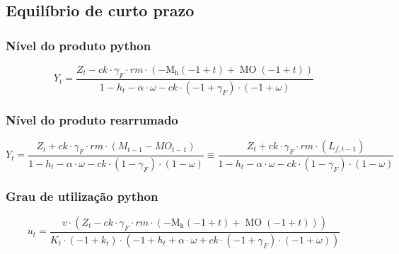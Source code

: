 \documentclass[11pt]{article}
\begin{document}
\subsection*{Equilíbrio de curto prazo}
\label{sec:orged3f1f8}

\subsubsection*{Nível do produto python}
\label{sec:org9433704}

\begin{latex}
\begin{equation}
Y_{t} = \frac{Z_t - ck \cdot \gamma_{F} \cdot rm \cdot \left(- \operatorname{M_{h}}{\left(-1 + t \right)} + \operatorname{MO}{\left(-1 + t \right)}\right)}{1 - h_t - \alpha \cdot \omega - ck \cdot \left(-1 + \gamma_{F}\right) \cdot \left(-1 + \omega\right)}
\end{equation}
\end{latex}

\subsubsection*{Nível do produto rearrumado}
\label{sec:org42197ad}

\begin{latex}
\begin{equation}
Y_{t} = \frac{Z_t + ck \cdot \gamma_{F} \cdot rm \cdot \left(M_{t-1} - MO_{t-1}\right)}{1 - h_t - \alpha \cdot \omega - ck \cdot \left(1- \gamma_{F}\right) \cdot \left(1 - \omega\right)} \equiv \frac{Z_t + ck \cdot \gamma_{F} \cdot rm \cdot \left(L_{f,t-1}\right)}{1 - h_t - \alpha \cdot \omega - ck \cdot \left(1- \gamma_{F}\right) \cdot \left(1 - \omega\right)}
\end{equation}
\end{latex}
\subsubsection*{Grau de utilização python}
\label{sec:orgeb5b9a4}

\begin{latex}
\begin{equation}
u_{t} = \frac{v \cdot \left(Z_t - ck \cdot \gamma_{F} \cdot rm \cdot \left(- \operatorname{M_{h}}{\left(-1 + t \right)} + \operatorname{MO}{\left(-1 + t \right)}\right)\right)}{K_t \cdot \left(-1 + k_t\right) \cdot \left(-1 + h_t + \alpha \cdot \omega + ck \cdot \left(-1 + \gamma_{F}\right) \cdot \left(-1 + \omega\right)\right)}
\end{equation}
\end{latex}
\end{document}
